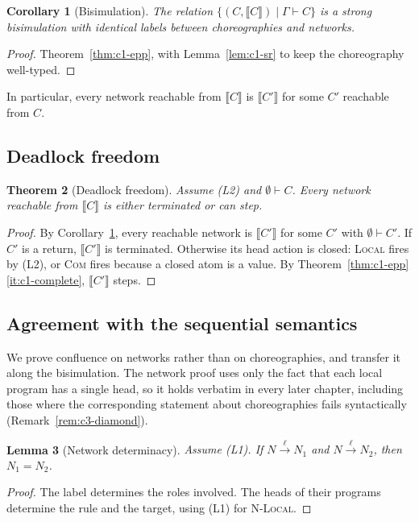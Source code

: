 \documentclass[11pt]{report}
\theoremstyle{plain}
\newtheorem{theorem}{Theorem}[chapter]
\newtheorem{lemma}[theorem]{Lemma}
\newtheorem{corollary}[theorem]{Corollary}
\theoremstyle{definition}
\theoremstyle{remark}
\newcommand{\lto}[1]{\xrightarrow{\;#1\;}}
\newcommand{\projn}[1]{\llbracket #1 \rrbracket}
\newcommand{\rn}[1]{{\normalfont\scshape #1}}
\begin{document}
\begin{corollary}[Bisimulation]\label{cor:c1-bisim}
  The relation $\{(C,\projn{C})\mid\Gamma\vdash C\}$ is a strong bisimulation
  with identical labels between choreographies and networks.
\end{corollary}
\begin{proof}
  Theorem~\ref{thm:c1-epp}, with Lemma~\ref{lem:c1-sr} to keep the
  choreography well-typed.
\end{proof}

In particular, every network reachable from $\projn{C}$ is $\projn{C'}$ for
some $C'$ reachable from $C$.

\subsection{Deadlock freedom}
\label{sec:c1-df}

\begin{theorem}[Deadlock freedom]\label{thm:c1-df}
  Assume (L2) and $\emptyset\vdash C$.  Every network reachable from
  $\projn{C}$ is either terminated or can step.
\end{theorem}
\begin{proof}
  By Corollary~\ref{cor:c1-bisim}, every reachable network is $\projn{C'}$ for
  some $C'$ with $\emptyset\vdash C'$.  If $C'$ is a return, $\projn{C'}$ is
  terminated.  Otherwise its head action is closed: \rn{Local} fires by (L2),
  or \rn{Com} fires because a closed atom is a value.  By
  Theorem~\ref{thm:c1-epp}\ref{it:c1-complete}, $\projn{C'}$ steps.
\end{proof}

\subsection{Agreement with the sequential semantics}
\label{sec:c1-confluence}

We prove confluence on networks rather than on choreographies, and transfer it
along the bisimulation.  The network proof uses only the fact that each local
program has a single head, so it holds verbatim in every later chapter,
including those where the corresponding statement about choreographies fails
syntactically (Remark~\ref{rem:c3-diamond}).

\begin{lemma}[Network determinacy]\label{lem:c1-det}
  Assume (L1).  If $N\lto{\ell}N_1$ and $N\lto{\ell}N_2$, then $N_1=N_2$.
\end{lemma}
\begin{proof}
  The label determines the roles involved.  The heads of their programs
  determine the rule and the target, using (L1) for \rn{N-Local}.
\end{proof}
\end{document}
